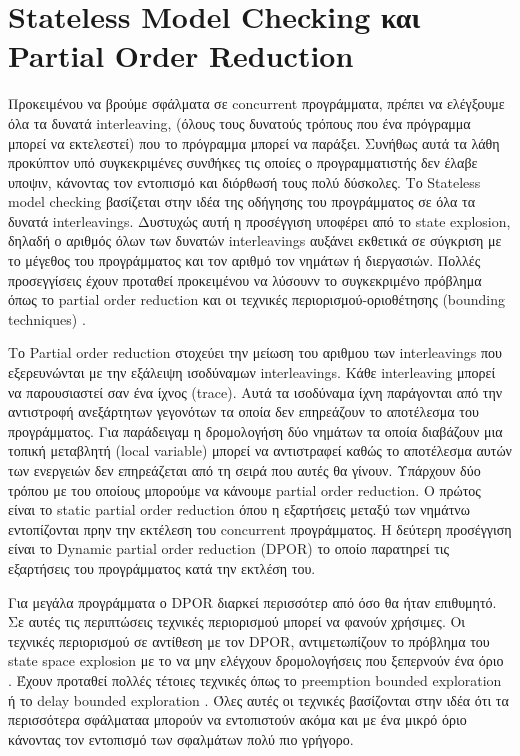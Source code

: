 
\section{Stateless Model Checking και Partial Order Reduction}

Προκειμένου να βρούμε σφάλματα σε  concurrent προγράμματα, πρέπει να ελέγξουμε όλα τα δυνατά interleaving, (όλους τους δυνατούς τρόπους που ένα πρόγραμμα μπορεί να εκτελεστεί)
που το πρόγραμμα μπορεί να παράξει. Συνήθως αυτά τα λάθη προκύπτον υπό συγκεκριμένες συνϑήκες τις οποίες ο προγραμματιστής δεν έλαβε υποψιν, κάνοντας τον εντοπισμό και
διόρθωσή τους πολύ δύσκολες.
Το Stateless model checking βασίζεται στην ιδέα της οδήγησης του προγράμματος σε όλα τα δυνατά interleavings. Δυστυχώς αυτή η προσέγγιση υποφέρει από το state explosion,
δηλαδή ο αριθμός όλων των δυνατών interleavings αυξάνει εκθετικά σε σύγκριση με το μέγεθος του προγράμματος και τον αριθμό τον νημάτων ή διεργασιών.
Πολλές προσεγγίσεις έχουν προταθεί προκειμένου να λύσουνν το συγκεκριμένο πρόβλημα όπως το partial order reduction \cite{Godefroid1996} και οι τεχνικές περιορισμού-οριοθέτησης
(bounding techniques) \cite{BPOR}. 

Το Partial order reduction στοχεύει την μείωση του αριθμου των interleavings που εξερευνώνται με την εξάλειψη ισοδύναμων interleavings.
Κάθε interleaving μπορεί να παρουσιαστεί σαν ένα ίχνος (trace).
Αυτά τα ισοδύναμα ίχνη παράγονται από την αντιστροφή ανεξάρτητων γεγονότων τα οποία δεν επηρεάζουν το αποτέλεσμα του προγράμματος. Για παράδειγαμ η δρομολογήση δύο νημάτων τα οποία
διαβάζουν μια τοπική μεταβλητή (local variable) μπορεί να αντιστραφεί καθώς το αποτέλεσμα αυτών των ενεργειών δεν επηρεάζεται από τη σειρά που αυτές θα γίνουν.
Υπάρχουν δύο τρόπου με του οποίους μπορούμε να κάνουμε partial order reduction. Ο πρώτος είναι το 
static partial order reduction \cite{Static1997} όπου η εξαρτήσεις μεταξύ των νημάτνω εντοπίζονται πρην την εκτέλεση του concurrent προγράμματος. 
Η δεύτερη προσέγγιση είναι το  Dynamic partial order reduction (DPOR) \cite{FlanaganDPOR} το οποίο παρατηρεί τις εξαρτήσεις του προγράμματος κατά την εκτλέση του.

Για μεγάλα προγράμματα ο DPOR διαρκεί περισσότερ από όσο θα ήταν επιθυμητό. Σε αυτές τις περιπτώσεις τεχνικές περιορισμού μπορεί να φανούν χρήσιμες. 
Οι τεχνικές περιορισμού σε αντίθεση με τον DPOR, αντιμετωπίζουν το πρόβλημα του state space explosion με το να μην ελέγχουν δρομολογήσεις που ξεπερνούν ένα όριο \cite{Thomson}.
Έχουν προταθεί πολλές τέτοιες τεχνικές όπως το preemption bounded exploration \cite{BPOR} ή το delay bounded exploration \cite{DelayBounded@POPL-11}. 
Όλες αυτές οι τεχνικές βασίζονται στην ιδέα ότι τα περισσότερα σφάλματαα μπορούν να εντοπιστούν ακόμα και με ένα μικρό όριο κάνοντας τον εντοπισμό των σφαλμάτων πολύ πιο γρήγορο.

